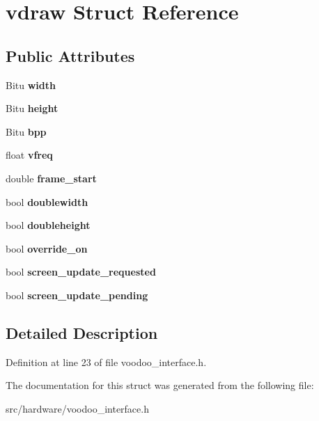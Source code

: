 \hypertarget{structvdraw}{\section{vdraw Struct Reference}
\label{structvdraw}
}
\subsection*{Public Attributes}
\begin{DoxyCompactItemize}
\item 
\hypertarget{structvdraw_a9fc7007c4a5dcda55736946aa1a1ed68}{Bitu {\bfseries width}}\label{structvdraw_a9fc7007c4a5dcda55736946aa1a1ed68}

\item 
\hypertarget{structvdraw_afcd77730605e17837fa71714639945d6}{Bitu {\bfseries height}}\label{structvdraw_afcd77730605e17837fa71714639945d6}

\item 
\hypertarget{structvdraw_a4bd8365a6abe4078c5bc1ea5fb084317}{Bitu {\bfseries bpp}}\label{structvdraw_a4bd8365a6abe4078c5bc1ea5fb084317}

\item 
\hypertarget{structvdraw_a4d31eecfb79b8b39f1e557b6ebf05975}{float {\bfseries vfreq}}\label{structvdraw_a4d31eecfb79b8b39f1e557b6ebf05975}

\item 
\hypertarget{structvdraw_a751136577a0ec2e179c1929345d7313b}{double {\bfseries frame\-\_\-start}}\label{structvdraw_a751136577a0ec2e179c1929345d7313b}

\item 
\hypertarget{structvdraw_a40416b6960dcbe54cd218fce209db112}{bool {\bfseries doublewidth}}\label{structvdraw_a40416b6960dcbe54cd218fce209db112}

\item 
\hypertarget{structvdraw_add72d01fef666db105d0771bed21f7d8}{bool {\bfseries doubleheight}}\label{structvdraw_add72d01fef666db105d0771bed21f7d8}

\item 
\hypertarget{structvdraw_ae0d26bfb602dac880344e6a7f14ca1d9}{bool {\bfseries override\-\_\-on}}\label{structvdraw_ae0d26bfb602dac880344e6a7f14ca1d9}

\item 
\hypertarget{structvdraw_a139dd22e21582c1a3f2eed0cc2fea409}{bool {\bfseries screen\-\_\-update\-\_\-requested}}\label{structvdraw_a139dd22e21582c1a3f2eed0cc2fea409}

\item 
\hypertarget{structvdraw_ab33e5f7163ed407e87846aa5717c5a56}{bool {\bfseries screen\-\_\-update\-\_\-pending}}\label{structvdraw_ab33e5f7163ed407e87846aa5717c5a56}

\end{DoxyCompactItemize}


\subsection{Detailed Description}


Definition at line 23 of file voodoo\-\_\-interface.\-h.



The documentation for this struct was generated from the following file\-:\begin{DoxyCompactItemize}
\item 
src/hardware/voodoo\-\_\-interface.\-h\end{DoxyCompactItemize}
